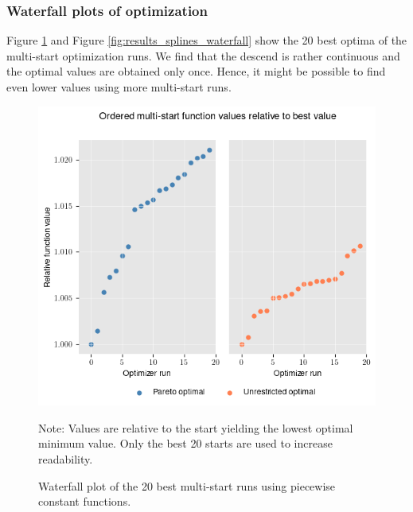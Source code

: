 \subsubsection{Waterfall plots of optimization}
\label{A:waterfall}
Figure \ref{fig:results_piecewise_waterfall} and Figure \ref{fig:results_splines_waterfall} show the 20 best optima of the multi-start optimization runs. We find that the descend is rather continuous and the optimal values are obtained only once. Hence, it might be possible to find even lower values using more multi-start runs.
\begin{figure}[h!]
\centering
\includegraphics[scale=0.53]{images/piecewise_waterfall.png}\\
\begin{flushleft}
\scriptsize{Note:} Values are relative to the start yielding the lowest optimal minimum value. Only the best 20 starts are used to increase readability. 
\end{flushleft}
\caption{Waterfall plot of the 20 best multi-start runs using piecewise constant functions.}
\label{fig:results_piecewise_waterfall}
\end{figure}


